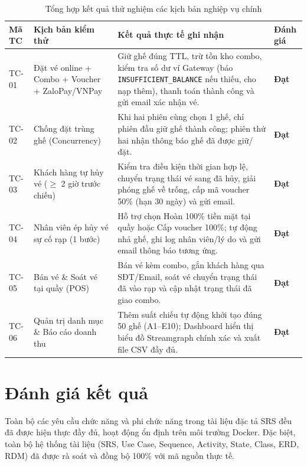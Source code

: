 \begin{longtable}{|p{1.2cm}|p{4.3cm}|p{6.8cm}|p{2.6cm}|}
\caption{Tổng hợp kết quả thử nghiệm các kịch bản nghiệp vụ chính} \label{tab:test_results} \\
\hline
\rowcolor{headerblue} \textbf{Mã TC} & \textbf{Kịch bản kiểm thử} & \textbf{Kết quả thực tế ghi nhận} & \textbf{Đánh giá} \\ \hline
\endhead
TC-01 & Đặt vé online + Combo + Voucher + ZaloPay/VNPay & Giữ ghế đúng TTL, trừ tồn kho combo, kiểm tra số dư ví Gateway (báo \texttt{INSUFFICIENT\_BALANCE} nếu thiếu, cho nạp thêm), thanh toán thành công và gửi email xác nhận vé. & \textbf{Đạt} \\ \hline
TC-02 & Chống đặt trùng ghế (Concurrency) & Khi hai phiên cùng chọn 1 ghế, chỉ phiên đầu giữ ghế thành công; phiên thứ hai nhận thông báo ghế đã được giữ/đặt. & \textbf{Đạt} \\ \hline
TC-03 & Khách hàng tự hủy vé ($\ge$ 2 giờ trước chiếu) & Kiểm tra điều kiện thời gian hợp lệ, chuyển trạng thái vé sang đã hủy, giải phóng ghế về trống, cấp mã voucher 50\% (hạn 30 ngày) và gửi email. & \textbf{Đạt} \\ \hline
TC-04 & Nhân viên ép hủy vé sự cố rạp (1 bước) & Hỗ trợ chọn Hoàn 100\% tiền mặt tại quầy hoặc Cấp voucher 100\%; tự động nhả ghế, ghi log nhân viên/lý do và gửi email thông báo tương ứng. & \textbf{Đạt} \\ \hline
TC-05 & Bán vé \& Soát vé tại quầy (POS) & Bán vé kèm combo, gắn khách hàng qua SĐT/Email, soát vé chuyển trạng thái đã vào rạp và cập nhật trạng thái đã giao combo. & \textbf{Đạt} \\ \hline
TC-06 & Quản trị danh mục \& Báo cáo doanh thu & Thêm suất chiếu tự động khởi tạo đúng 50 ghế (A1--E10); Dashboard hiển thị biểu đồ Streamgraph chính xác và xuất file CSV đầy đủ. & \textbf{Đạt} \\ \hline
\end{longtable}

\section{Đánh giá kết quả}
Toàn bộ các yêu cầu chức năng và phi chức năng trong tài liệu đặc tả SRS đều đã được hiện thực đầy đủ, hoạt động ổn định trên môi trường Docker. Đặc biệt, toàn bộ hệ thống tài liệu (SRS, Use Case, Sequence, Activity, State, Class, ERD, RDM) đã được rà soát và đồng bộ 100\% với mã nguồn thực tế.
